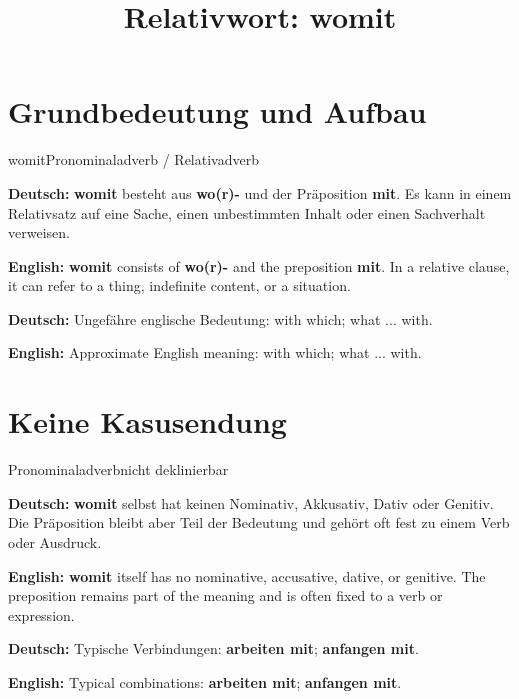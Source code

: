 \documentclass[a4paper,11pt]{article}
\title{Relativwort: \glqq womit\grqq{}}
\date{}
\newcommand{\GermanText}[1]{\textbf{Deutsch: }#1\par}
\newcommand{\EnglishText}[1]{{\small\color{SoftGray}\textbf{English: }#1\par}}
\begin{document}
\maketitle

\tableofcontents

\newpage

\section{Grundbedeutung und Aufbau}

\begin{grammarentry}{womit}{Pronominaladverb / Relativadverb}

\GermanText{\textbf{womit} besteht aus \textbf{wo(r)-} und der Präposition \textbf{mit}. Es kann in einem Relativsatz auf eine Sache, einen unbestimmten Inhalt oder einen Sachverhalt verweisen.}

\EnglishText{\textbf{womit} consists of \textbf{wo(r)-} and the preposition \textbf{mit}. In a relative clause, it can refer to a thing, indefinite content, or a situation.}

\GermanText{Ungefähre englische Bedeutung: \glqq with which; what ... with\grqq{}.}

\EnglishText{Approximate English meaning: \glqq with which; what ... with\grqq{}.}

\end{grammarentry}

\section{Keine Kasusendung}

\begin{grammarentry}{Pronominaladverb}{nicht deklinierbar}

\GermanText{\textbf{womit} selbst hat keinen Nominativ, Akkusativ, Dativ oder Genitiv. Die Präposition bleibt aber Teil der Bedeutung und gehört oft fest zu einem Verb oder Ausdruck.}

\EnglishText{\textbf{womit} itself has no nominative, accusative, dative, or genitive. The preposition remains part of the meaning and is often fixed to a verb or expression.}

\GermanText{Typische Verbindungen: \textbf{arbeiten mit}; \textbf{anfangen mit}.}

\EnglishText{Typical combinations: \textbf{arbeiten mit}; \textbf{anfangen mit}.}

\end{grammarentry}
\end{document}
